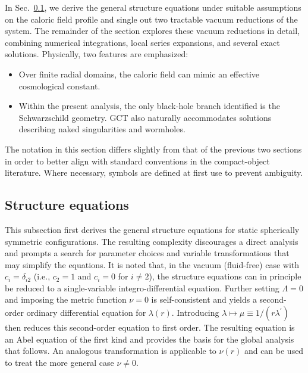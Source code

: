 \documentclass[aps,prd,twocolumn]{revtex4-2}
\begin{document}
In Sec.~\ref{sec:V.A}, we derive the general structure equations under suitable assumptions on the caloric field profile and single out two tractable vacuum reductions of the system. The remainder of the section explores these vacuum reductions in detail, combining numerical integrations, local series expansions, and several exact solutions. Physically, two features are emphasized:
\begin{itemize}
  \item Over finite radial domains, the caloric field can mimic an effective cosmological constant.
  \item Within the present analysis, the only black-hole branch identified is the Schwarzschild geometry. GCT also naturally accommodates solutions describing naked singularities and wormholes.
\end{itemize}

The notation in this section differs slightly from that of the previous two sections in order to better align with standard conventions in the compact-object literature. Where necessary, symbols are defined at first use to prevent ambiguity.

\subsection{Structure equations}\label{sec:V.A}
This subsection first derives the general structure equations for static spherically symmetric configurations. The resulting complexity discourages a direct analysis and prompts a search for parameter choices and variable transformations that may simplify the equations. It is noted that, in the vacuum (fluid-free) case with $c_i=\delta_{i2}$ (i.e., $c_2=1$ and $c_i=0$ for $i\neq2$), the structure equations can in principle be reduced to a single-variable integro-differential equation. Further setting $\Lambda=0$ and imposing the metric function $\nu=0$ is self-consistent and yields a second-order ordinary differential equation for $\lambda(r)$. Introducing $\lambda\mapsto\mu\equiv1/(r\lambda^\prime)$ then reduces this second-order equation to first order. The resulting equation is an Abel equation of the first kind \cite{Polyanin2018.book} and provides the basis for the global analysis that follows. An analogous transformation is applicable to $\nu(r)$ and can be used to treat the more general case $\nu\neq0$.
\end{document}
